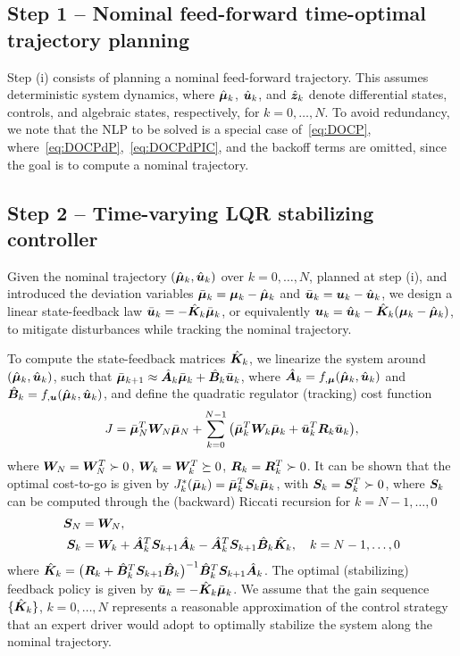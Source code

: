 \subsection{Step 1 -- Nominal feed-forward time-optimal trajectory planning}
\label{sec:nominalFF}
Step (i) consists of planning a nominal feed-forward trajectory. This assumes deterministic system dynamics, where $\hat{\boldsymbol{\mu}}_k$, $\hat{\boldsymbol{u}}_k$, and $\hat{\boldsymbol{z}}_k$ denote differential states, controls, and algebraic states, respectively, for \( k = 0, \ldots, N \). To avoid redundancy, we note that the NLP to be solved is a special case of~\eqref{eq:DOCP}, where~\eqref{eq:DOCPdP},~\eqref{eq:DOCPdPIC}, and the backoff terms are omitted, since the goal is to compute a nominal trajectory.

\subsection{Step 2 -- Time-varying LQR stabilizing controller}
\label{sec:LQR}

Given the nominal trajectory $(\hat{\boldsymbol{\mu}}_k, \hat{\boldsymbol{u}}_k)$ over $k=0,\ldots, N$, planned at step (i), and introduced the deviation variables $\bar{\boldsymbol{\mu}}_k=\boldsymbol{\mu}_k - \hat{\boldsymbol{\mu}}_k$ and $\bar{\boldsymbol{u}}_k = \boldsymbol{u}_k - \hat{\boldsymbol{u}}_k$, we design a linear state-feedback law $\bar{\boldsymbol{u}}_k= -\hat{\boldsymbol{K}}_k \bar{\boldsymbol{\mu}}_k$, or equivalently $\boldsymbol{u}_k = \hat{\boldsymbol{u}}_k - \hat{\boldsymbol{K}}_k (\boldsymbol{\mu}_k - \hat{\boldsymbol{\mu}}_k)$, to mitigate disturbances while tracking the nominal trajectory.

To compute the state-feedback matrices $\hat{\boldsymbol{K}}_k$, we linearize the system around $(\hat{\boldsymbol{\mu}}_k, \hat{\boldsymbol{u}}_k)$, such that $\bar{\boldsymbol{\mu}}_{k+1} \approx \hat{\boldsymbol{A}}_{k}\bar{\boldsymbol{\mu}}_k + \hat{\boldsymbol{B}}_k \bar{\boldsymbol{u}}_k$, where $\hat{\boldsymbol{A}}_k = f_{,\boldsymbol{\mu}}(\hat{\boldsymbol{\mu}}_k,\hat{\boldsymbol{u}}_k)$ and $\hat{\boldsymbol{B}}_k = f_{,\boldsymbol{u}}(\hat{\boldsymbol{\mu}}_k,\hat{\boldsymbol{u}}_k)$, and define the quadratic regulator (tracking) cost function
\begin{align}
J = \bar{\boldsymbol{\mu}}_N^T \boldsymbol{W}_N \bar{\boldsymbol{\mu}}_N + \sum_{k=0}^{N-1} \big( \bar{\boldsymbol{\mu}}_k^{T} \boldsymbol{W}_k \bar{\boldsymbol{\mu}}_k + \bar{\boldsymbol{u}}_k^T \boldsymbol{R}_k \bar{\boldsymbol{u}}_k \big),
\end{align}
where $\boldsymbol{W}_N=\boldsymbol{W}_N^T \succ 0$, $\boldsymbol{W}_k=\boldsymbol{W}_k^T \succeq 0$, $\boldsymbol{R}_k=\boldsymbol{R}_k^T \succ 0$. It can be shown that the optimal cost-to-go is given by $J_k^*(\bar{\boldsymbol{\mu}}_k) = \bar{\boldsymbol{\mu}}_k^T \boldsymbol{S}_k \bar{\boldsymbol{\mu}}_k$, with $\boldsymbol{S}_k = \boldsymbol{S}_k^T \succ 0$, where $\boldsymbol{S}_k$ can be computed through the (backward) Riccati recursion for $k=N-1,\ldots, 0$
\begin{align}
\boldsymbol{S}_N &= \boldsymbol{W}_N,\\
\boldsymbol{S}_{k} &= \boldsymbol{W}_k + \hat{\boldsymbol{A}}_k^T \boldsymbol{S}_{k+1} \hat{\boldsymbol{A}}_k - \hat{\boldsymbol{A}}_k^T \boldsymbol{S}_{k+1}\hat{\boldsymbol{B}}_k \hat{\boldsymbol{K}}_k,\quad k={N-1, \ldots, 0}
\end{align}
where  $\hat{\boldsymbol{K}}_k =\big( \boldsymbol{R}_k+\hat{\boldsymbol{B}}_k^T \boldsymbol{S}_{k+1} \hat{\boldsymbol{B}}_k \big)^{-1} \hat{\boldsymbol{B}}_k^T \boldsymbol{S}_{k+1} \hat{\boldsymbol{A}}_k$. The optimal (stabilizing) feedback policy is given by $\bar{\boldsymbol{u}}_k=-\hat{\boldsymbol{K}}_k \bar{\boldsymbol{\mu}}_k$. We assume that the gain sequence $\{\hat{\boldsymbol{K}}_k\}$, $k=0,\ldots, N$ represents a reasonable approximation of the control strategy that an expert driver would adopt to optimally stabilize the system along the nominal trajectory.


